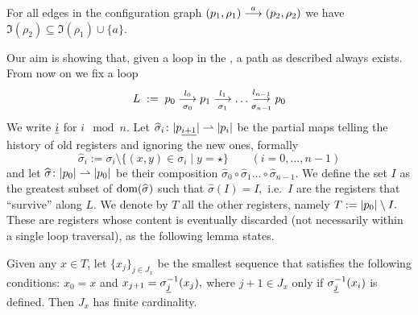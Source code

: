 


{
\begin{lemma}
\label{lem:tr-names}
For all edges in the configuration graph $(p_1,\rho_1) \overset{a}{\longrightarrow} (p_2,\rho_2)$ we have $\Im(\rho_2) \subseteq \Im(\rho_1) \cup \{ a \}$.
\end{lemma}
}

Our aim is showing that, given a loop in the \hdma{}, a path as described always exists. From now on we fix a loop
\[
	L \;:=\; p_0 \overset{l_0}{\underset{\sigma_0}{\longrightarrow}} p_1 \overset{l_1}{\underset{\sigma_1}{\longrightarrow}} \dots \overset{l_{n-1}}{\underset{\sigma_{n-1}}{\longrightarrow}} p_0
\]
We write ${\underline{i}}$ for $i \mod n$. Let $\widehat{\sigma}_i \colon |p_{\underline{i+1}}| \rightharpoonup |p_i|$ be the partial maps telling the history of old registers and ignoring the new ones, formally
\[
	\widehat{\sigma}_i := \sigma_i \setminus \{ (x,y) \in \sigma_i \mid y = \star \} 
	\qquad (i=0,\dots,n-1)
\]
and let $\widehat{\sigma} \colon |p_0| \rightharpoonup |p_0|$ be their composition $\widehat{\sigma}_0 \circ \widehat{\sigma}_1 \dots \circ \widehat{\sigma}_{n-1}$. We define the set $I$ as the greatest subset of $\operatorname{dom}(\widehat{\sigma})$ such that
$
	\widehat{\sigma}(I) = I,
$
i.e.\ $I$ are the registers that ``survive'' along $L$. We denote by $T$ all the other registers, namely 
$
	T := |p_0| \setminus I .
$
These are registers whose content is eventually discarded (not necessarily within a single loop traversal), as the following lemma states.
%
%
\begin{lemma}
\label{lem:rho-forget}
Given any $x \in T$, let $\{x_j\}_{j \in J_x}$ be the smallest sequence that satisfies the following conditions:
$
	x_0 = x
$
and
$
	x_{j+1} = \sigma_{{\underline{j}}}^{-1}(x_j),
$
where $j+1 \in J_x$ only if $\sigma_{{\underline{j}}}^{-1}(x_i)$ is defined. Then $J_x$ has finite cardinality.

\end{lemma}

